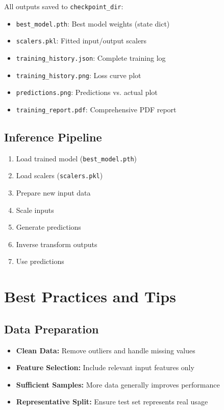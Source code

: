 \documentclass[11pt,a4paper]{article}
\begin{document}
All outputs saved to \texttt{checkpoint\_dir}:

\begin{itemize}
    \item \texttt{best\_model.pth}: Best model weights (state dict)
    \item \texttt{scalers.pkl}: Fitted input/output scalers
    \item \texttt{training\_history.json}: Complete training log
    \item \texttt{training\_history.png}: Loss curve plot
    \item \texttt{predictions.png}: Predictions vs. actual plot
    \item \texttt{training\_report.pdf}: Comprehensive PDF report
\end{itemize}

\subsection{Inference Pipeline}

\begin{enumerate}
    \item Load trained model (\texttt{best\_model.pth})
    \item Load scalers (\texttt{scalers.pkl})
    \item Prepare new input data
    \item Scale inputs
    \item Generate predictions
    \item Inverse transform outputs
    \item Use predictions
\end{enumerate}

\newpage
\section{Best Practices and Tips}

\subsection{Data Preparation}

\begin{itemize}
    \item \textbf{Clean Data:} Remove outliers and handle missing values
    \item \textbf{Feature Selection:} Include relevant input features only
    \item \textbf{Sufficient Samples:} More data generally improves performance
    \item \textbf{Representative Split:} Ensure test set represents real usage
\end{itemize}
\end{document}

